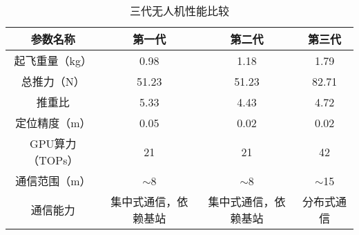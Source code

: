 \begin{table}[!ht]
    \centering
    \begin{tabular}{cccc}
    \hline
        参数名称 & 第一代 & 第二代 & 第三代 \\ \hline
        起飞重量（kg） & 0.98 & 1.18 & 1.79 \\ 
        总推力（N） & 51.23 & 51.23 & 82.71 \\ 
        推重比 & 5.33 & 4.43 & 4.72 \\ 
        定位精度（m） & 0.05 & 0.02 & 0.02 \\ 
        GPU算力（TOPs） & 21 & 21 & 42 \\ 
        通信范围（m） & $\sim$8 & $\sim$8 & $\sim$15 \\ 
        通信能力 & 集中式通信，依赖基站 & 集中式通信，依赖基站 & 分布式通信 \\ \hline
    \end{tabular}
    \caption{三代无人机性能比较}
    \label{tab_hardware_cmp}
\end{table}

